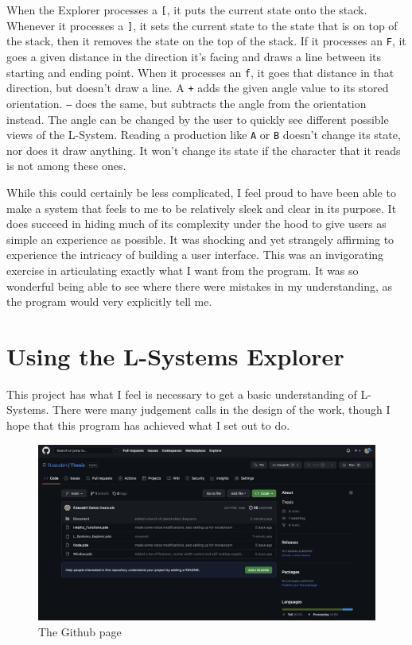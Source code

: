 \documentclass[12pt,twoside]{reedthesis}
\newcommand{\code}[1]{\texttt{#1}}
\begin{document}
	When the Explorer processes a \code{[}, it puts the current state onto the stack. Whenever it processes a \code{]}, it sets the current state to the state that is on top of the stack, then it removes the state on the top of the stack. If it processes an \code{F}, it goes a given distance in the direction it's facing and draws a line between its starting and ending point. When it processes an \code{f}, it goes that distance in that direction, but doesn't draw a line. A \code{+} adds the given angle value to its stored orientation. \code{–} does the same, but subtracts the angle from the orientation instead. The angle can be changed by the user to quickly see different possible views of the L-System. Reading a production like \code{A} or \code{B} doesn't change its state, nor does it draw anything. It won't change its state if the character that it reads is not among these ones.
	
	While this could certainly be less complicated, I feel proud to have been able to make a system that feels to me to be relatively sleek and clear in its purpose. It does succeed in hiding much of its complexity under the hood to give users as simple an experience as possible. It was shocking and yet strangely affirming to experience the intricacy of building a user interface. This was an invigorating exercise in articulating exactly what I want from the program. It was so wonderful being able to see where there were mistakes in my understanding, as the program would very explicitly tell me.

\section{Using the L-Systems Explorer}
\label{Using-the-L-Systems-Explorer}

	This project has what I feel is necessary to get a basic understanding of L-Systems. There were many judgement calls in the design of the work, though I hope that this program has achieved what I set out to do.\\
	
	
	\begin{figure}[h]
	\centering
	\includegraphics[scale=0.3]{Images/Github}
	\caption{The Github page}
	\label {Github}
	\end{figure}
	
\end{document}
